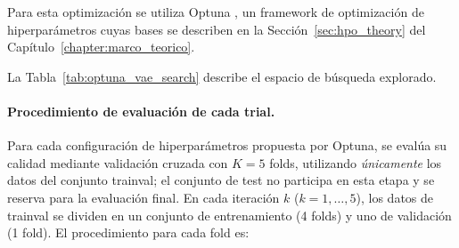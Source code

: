 Para esta optimización se utiliza Optuna \cite{akiba2019optuna}, un framework de optimización de hiperparámetros cuyas bases se describen en la Sección~\ref{sec:hpo_theory} del Capítulo~\ref{chapter:marco_teorico}.

La Tabla~\ref{tab:optuna_vae_search} describe el espacio de búsqueda explorado.

\begin{table}[H]
\centering
\caption{Espacio de búsqueda de Optuna para la optimización del $\beta$-VAE.}
\label{tab:optuna_vae_search}
\end{table}

\paragraph{Procedimiento de evaluación de cada trial.} Para cada configuración de hiperparámetros propuesta por Optuna, se evalúa su calidad mediante validación cruzada con $K = 5$ folds, utilizando \emph{únicamente} los datos del conjunto trainval; el conjunto de test no participa en esta etapa y se reserva para la evaluación final. En cada iteración $k$ ($k = 1, \ldots, 5$), los datos de trainval se dividen en un conjunto de entrenamiento (4 folds) y uno de validación (1 fold). El procedimiento para cada fold es:

